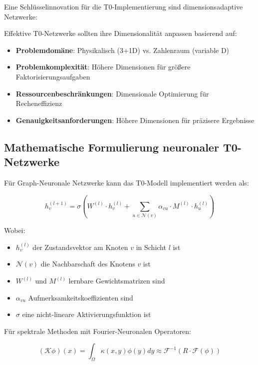 \documentclass[12pt,a4paper]{article}
\begin{document}
	Eine Schlüsselinnovation für die T0-Implementierung sind dimensionsadaptive Netzwerke:
	
	\begin{tcolorbox}[colback=yellow!5!white,colframe=orange!75!black,title=Dimensionsadaptives Netzwerkdesign]
		Effektive T0-Netzwerke sollten ihre Dimensionalität anpassen basierend auf:
		\begin{itemize}
			\item \textbf{Problemdomäne}: Physikalisch (3+1D) vs. Zahlenraum (variable D)
			\item \textbf{Problemkomplexität}: Höhere Dimensionen für größere Faktorisierungsaufgaben
			\item \textbf{Ressourcenbeschränkungen}: Dimensionale Optimierung für Recheneffizienz
			\item \textbf{Genauigkeitsanforderungen}: Höhere Dimensionen für präzisere Ergebnisse
		\end{itemize}
	\end{tcolorbox}
	
	\subsection{Mathematische Formulierung neuronaler T0-Netzwerke}
	\label{subsec:mathematical_neural}
	
	Für Graph-Neuronale Netzwerke kann das T0-Modell implementiert werden als:
	
	\begin{equation}
		h_v^{(l+1)} = \sigma\left(W^{(l)} \cdot h_v^{(l)} + \sum_{u \in \mathcal{N}(v)} \alpha_{vu} \cdot M^{(l)} \cdot h_u^{(l)}\right)
	\end{equation}
	
	Wobei:
	\begin{itemize}
		\item $h_v^{(l)}$ der Zustandsvektor am Knoten $v$ in Schicht $l$ ist
		\item $\mathcal{N}(v)$ die Nachbarschaft des Knotens $v$ ist
		\item $W^{(l)}$ und $M^{(l)}$ lernbare Gewichtsmatrizen sind
		\item $\alpha_{vu}$ Aufmerksamkeitskoeffizienten sind
		\item $\sigma$ eine nicht-lineare Aktivierungsfunktion ist
	\end{itemize}
	
	Für spektrale Methoden mit Fourier-Neuronalen Operatoren:
	
	\begin{equation}
		(\mathcal{K}\phi)(x) = \int_{\Omega} \kappa(x,y) \phi(y) dy \approx \mathcal{F}^{-1}(R \cdot \mathcal{F}(\phi))
	\end{equation}
	
\end{document}
